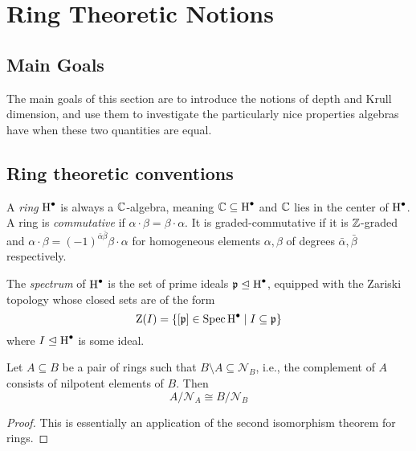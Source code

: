 \chapter{Ring Theoretic Notions}
\label{chap:ag-git}

\section{Main Goals}
\label{sec:ageom-goals}

The main goals of this section are to introduce the notions of depth and Krull dimension, and use them to investigate the particularly nice properties algebras have when these two quantities are equal.

\section{Ring theoretic conventions}
\label{sec:rings}

\begin{definition}
  A \emph{ring} $\operatorname{H}^\bullet$ is always a $\mathbb{C}$-algebra, meaning $\mathbb{C} \subseteq \operatorname{H}^\bullet$ and $\mathbb{C}$ lies in the center of $\operatorname{H}^\bullet$. A ring is \emph{commutative} if $\alpha \cdot \beta = \beta \cdot \alpha$. It is graded-commutative if it is $\mathbb{Z}$-graded and $\alpha \cdot \beta = (-1)^{\bar \alpha \bar \beta} \beta \cdot \alpha$ for homogeneous elements $\alpha, \beta$ of degrees $\bar \alpha, \bar \beta$ respectively.
\end{definition}

\begin{definition}
  The \emph{spectrum} of $\operatorname{H}^\bullet$ is the set of prime ideals $\mathfrak{p} \trianglelefteq \operatorname{H}^\bullet$, equipped with the Zariski topology whose closed sets are of the form
  \[
    \operatorname{Z}(I) = \left\{ [\mathfrak{p}] \in \operatorname{Spec} \operatorname{H}^\bullet \mid I \subseteq \mathfrak{p} \right\}
  \]
  where $I \trianglelefteq \operatorname{H}^\bullet$ is some ideal.
\end{definition}

\begin{proposition} \label{prop:iso-2}
  Let $A \subseteq B$ be a pair of rings such that $B \setminus A \subseteq \mathcal{N}_B$, i.e., the complement of $A$ consists of nilpotent elements of $B$. Then \[A / \mathcal{N}_A \cong B / \mathcal{N}_B\]
\end{proposition}
\begin{proof}
  This is essentially an application of the second isomorphism theorem for rings.
\end{proof}

